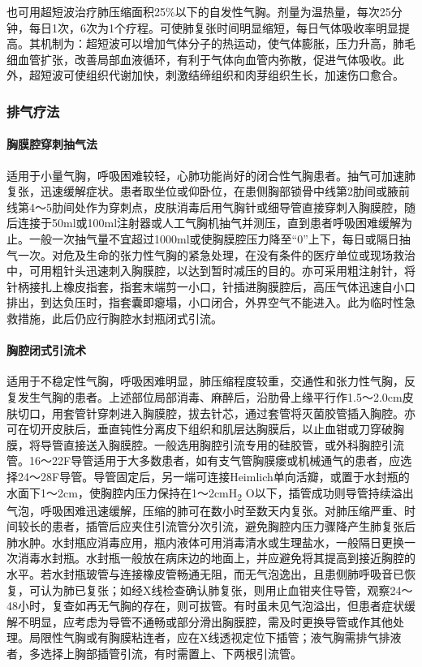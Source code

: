 也可用超短波治疗肺压缩面积25\%以下的自发性气胸。剂量为温热量，每次25分钟，每日1次，6次为1个疗程。可使肺复张时间明显缩短，每日气体吸收率明显提高。其机制为：超短波可以增加气体分子的热运动，使气体膨胀，压力升高，肺毛细血管扩张，改善局部血液循环，有利于气体向血管内弥散，促进气体吸收。此外，超短波可使组织代谢加快，刺激结缔组织和肉芽组织生长，加速伤口愈合。

\subsubsection{排气疗法}

\paragraph{胸膜腔穿刺抽气法}

适用于小量气胸，呼吸困难较轻，心肺功能尚好的闭合性气胸患者。抽气可加速肺复张，迅速缓解症状。患者取坐位或仰卧位，在患侧胸部锁骨中线第2肋间或腋前线第4～5肋间处作为穿刺点，皮肤消毒后用气胸针或细导管直接穿刺入胸膜腔，随后连接于50ml或100ml注射器或人工气胸机抽气并测压，直到患者呼吸困难缓解为止。一般一次抽气量不宜超过1000ml或使胸膜腔压力降至“0”上下，每日或隔日抽气一次。对危及生命的张力性气胸的紧急处理，在没有条件的医疗单位或现场救治中，可用粗针头迅速刺入胸膜腔，以达到暂时减压的目的。亦可采用粗注射针，将针柄接扎上橡皮指套，指套末端剪一小口，针插进胸膜腔后，高压气体迅速自小口排出，到达负压时，指套囊即瘪塌，小口闭合，外界空气不能进入。此为临时性急救措施，此后仍应行胸腔水封瓶闭式引流。

\paragraph{胸腔闭式引流术}

适用于不稳定性气胸，呼吸困难明显，肺压缩程度较重，交通性和张力性气胸，反复发生气胸的患者。上述部位局部消毒、麻醉后，沿肋骨上缘平行作1.5～2.0cm皮肤切口，用套管针穿刺进入胸膜腔，拔去针芯，通过套管将灭菌胶管插入胸腔。亦可在切开皮肤后，垂直钝性分离皮下组织和肌层达胸膜后，以止血钳或刀穿破胸膜，将导管直接送入胸膜腔。一般选用胸腔引流专用的硅胶管，或外科胸腔引流管。16～22F导管适用于大多数患者，如有支气管胸膜瘘或机械通气的患者，应选择24～28F导管。导管固定后，另一端可连接Heimlich单向活瓣，或置于水封瓶的水面下1～2cm，使胸腔内压力保持在1～2cmH\textsubscript{2}
O以下，插管成功则导管持续溢出气泡，呼吸困难迅速缓解，压缩的肺可在数小时至数天内复张。对肺压缩严重、时间较长的患者，插管后应夹住引流管分次引流，避免胸腔内压力骤降产生肺复张后肺水肿。水封瓶应消毒应用，瓶内液体可用消毒清水或生理盐水，一般隔日更换一次消毒水封瓶。水封瓶一般放在病床边的地面上，并应避免将其提高到接近胸腔的水平。若水封瓶玻管与连接橡皮管畅通无阻，而无气泡逸出，且患侧肺呼吸音已恢复，可认为肺已复张；如经X线检查确认肺复张，则用止血钳夹住导管，观察24～48小时，复查如再无气胸的存在，则可拔管。有时虽未见气泡溢出，但患者症状缓解不明显，应考虑为导管不通畅或部分滑出胸膜腔，需及时更换导管或作其他处理。局限性气胸或有胸膜粘连者，应在X线透视定位下插管；液气胸需排气排液者，多选择上胸部插管引流，有时需置上、下两根引流管。

